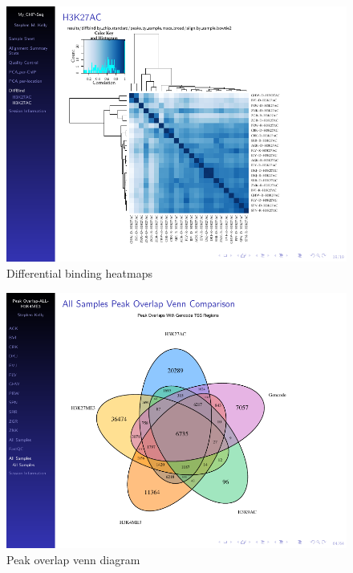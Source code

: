 \documentclass[final]{beamer}
\newlength{\onecolwid}
\newlength{\twocolwid}
\begin{document}
\begin{frame}[t]
\begin{columns}[t]
\begin{column}{\twocolwid}
\begin{columns}[t,totalwidth=\twocolwid]
\begin{column}{\onecolwid}
\begin{beamerboxesrounded}{}
\begin{figure}
\includegraphics[width=1.0\linewidth, frame]{./Figures/heatmap}
\caption{Differential binding heatmaps}
\label{fig:heatmap}
\end{figure}

\begin{figure}
\includegraphics[width=1.0\linewidth, frame]{./Figures/fiveway-venn_report}
\caption{Peak overlap venn diagram}
\label{fig:five_way_venn}
\end{figure}



\end{beamerboxesrounded}\hfill


\end{column}
\end{columns}
\end{column}
\end{columns}
\end{frame}
\end{document}
